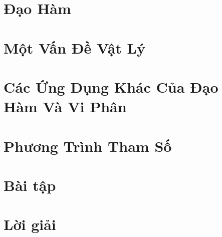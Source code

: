 \section{Đạo Hàm}

\section{Một Vấn Đề Vật Lý}

\section{Các Ứng Dụng Khác Của Đạo Hàm Và Vi Phân}

\section{Phương Trình Tham Số}

\section{Bài tập}

\section{Lời giải }


\begin{refsection}
\nocite{cack,engineeringHob,danko,calculusjame,demical}
\printbibliography
\end{refsection}


